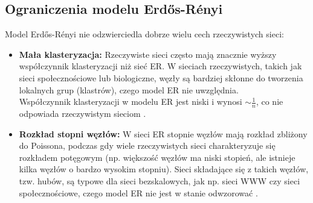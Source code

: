\subsection{Ograniczenia modelu Erdős-Rényi}
Model Erdős-Rényi nie odzwierciedla dobrze wielu cech rzeczywistych sieci:
\begin{itemize}
      \item \textbf{Mała klasteryzacja:} Rzeczywiste sieci często mają znacznie wyższy współczynnik klasteryzacji niż sieć ER.
            W sieciach rzeczywistych, takich jak sieci społecznościowe lub biologiczne, węzły są bardziej skłonne do tworzenia lokalnych grup (klastrów), czego model ER nie uwzględnia.
            \\ Współczynnik klasteryzacji w modelu ER jest niski i wynosi $\sim \frac{1}{n}$, co nie odpowiada rzeczywistym sieciom \cite{Watts1998}.

      \item \textbf{Rozkład stopni węzłów:} W sieci ER stopnie węzłów mają rozkład zbliżony do Poissona,
            podczas gdy wiele rzeczywistych sieci charakteryzuje się rozkładem potęgowym (np. większość węzłów ma niski stopień, ale istnieje kilka węzłów o bardzo wysokim stopniu).
            Sieci składające się z takich węzłów, tzw. hubów, są typowe dla sieci bezskalowych, jak np. sieci WWW czy sieci społecznościowe, czego model ER nie jest w stanie odwzorować \cite{Barabasi1999}.
\end{itemize}
